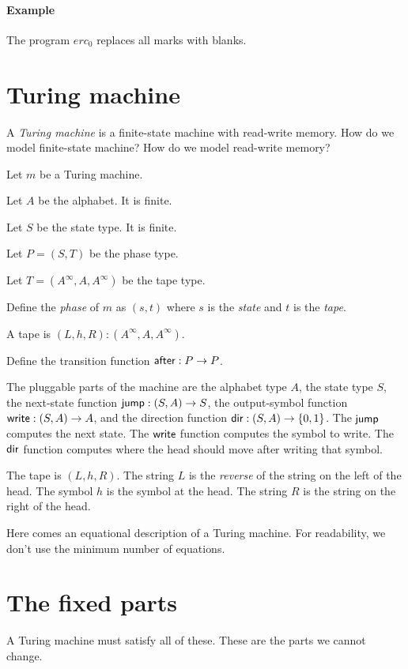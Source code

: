 \paragraph{Example}
The program \(e r c_0\) replaces all marks with blanks.

\section{Turing machine}

A \emph{Turing machine} is a finite-state machine with read-write memory.
How do we model finite-state machine?
How do we model read-write memory?

Let \(m\) be a Turing machine.

Let \(A\) be the alphabet.
It is finite.

Let \(S\) be the state type.
It is finite.

Let \(P = (S,T)\) be the phase type.

Let \(T = (A^\infty,A,A^\infty)\) be the tape type.

Define the \emph{phase} of \(m\) as \((s,t)\)
where \(s\) is the \emph{state} and \(t\) is the \emph{tape}.

A tape is \((L,h,R) : (A^\infty,A,A^\infty)\).

Define the transition function \(\textsf{after} : P \to P\).

The pluggable parts of the machine are
the alphabet type \(A\),
the state type \(S\),
the next-state function \(\textsf{jump} : (S,A) \to S\),
the output-symbol function \(\textsf{write} : (S,A) \to A\),
and the direction function \(\textsf{dir} : (S,A) \to \{0,1\}\).
The \(\textsf{jump}\) computes the next state.
The \(\textsf{write}\) function computes the symbol to write.
The \(\textsf{dir}\) function computes where the head should move after writing that symbol.

The tape is \((L,h,R)\).
The string \(L\) is the \emph{reverse} of the string on the left of the head.
The symbol \(h\) is the symbol at the head.
The string \(R\) is the string on the right of the head.

Here comes an equational description of a Turing machine.
For readability, we don't use the minimum number of equations.

\section{The fixed parts}

A Turing machine must satisfy all of these.
These are the parts we cannot change.

